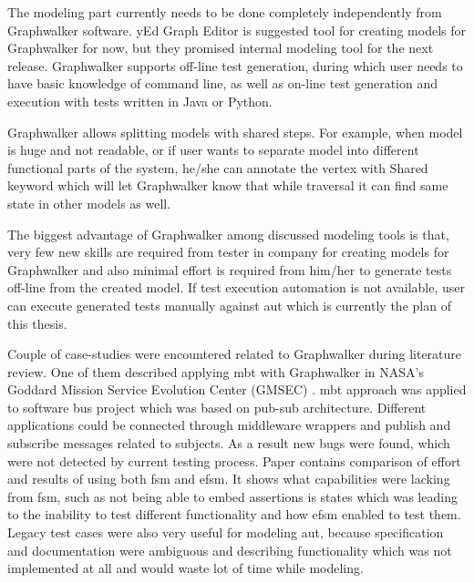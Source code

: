 \par
The modeling part currently needs to be done completely independently from Graphwalker software. yEd Graph Editor \cite{yEd} is suggested tool for creating models for Graphwalker for now, but they promised internal modeling tool for the next release. Graphwalker supports off-line test generation, during which user needs to have basic knowledge of command line, as well as on-line test generation and execution with tests written in Java or Python. 

\par
Graphwalker allows splitting models with shared steps. For example, when model is huge and not readable, or if user wants to separate model into different functional parts of the system, he/she can annotate the vertex with Shared keyword which will let Graphwalker know that while traversal it can find same state in other models as well.

\par
The biggest advantage of Graphwalker among discussed modeling tools is that, very few new skills are required from tester in company for creating models for Graphwalker and also minimal effort is required from him/her to generate tests off-line from the created model. If test execution automation is not available, user can execute generated tests manually against \acrshort{aut} which is currently the plan of this thesis.

\par
Couple of case-studies were encountered related to Graphwalker during literature review. One of them described applying \acrshort{mbt} with Graphwalker in NASA's Goddard Mission Service Evolution Center (GMSEC) \cite{GMSEC}. \acrshort{mbt} approach was applied to software bus project which was based on pub-sub architecture. Different applications could be connected through middleware wrappers and publish and subscribe messages related to subjects. As a result new bugs were found, which were not detected by current testing process. Paper contains comparison of effort and results of using both \acrshort{fsm} and \acrshort{efsm}. It shows what capabilities were lacking from \acrshort{fsm}, such as not being able to embed assertions is states which was leading to the inability to test different functionality and how \acrshort{efsm} enabled to test them. Legacy test cases were also very useful for modeling \acrshort{aut}, because specification and documentation were  ambiguous and describing functionality which was not implemented at all and would waste lot of time while modeling.

